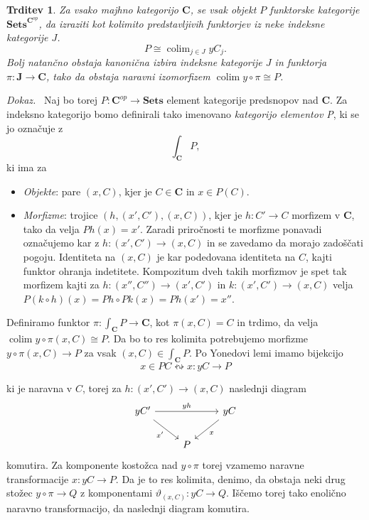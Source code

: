 \documentclass[12pt,a4paper]{book}
\theoremstyle{definition}
\theoremstyle{plain}
\newtheorem{trditev}[definicija]{Trditev}
\newenvironment{dokaz}{\emph{Dokaz.}\ }{\hspace{\fill}{$\Box$}}
\theoremstyle{definition}
\theoremstyle{remark}
\newcommand{\cat}[1]{\textbf{#1}}
\DeclareMathOperator{\colim}{colim}
\newcommand{\predsnop}[1]{\cat{Sets}^{\cat{#1}^{op}}}
\begin{document}
\begin{trditev}
\label{density theorem}
Za vsako majhno kategorijo $\cat{C}$, se vsak objekt $P$ funktorske kategorije $\predsnop{C}$, da izraziti kot kolimito predstavljivih funktorjev iz neke indeksne kategorije $J$.
$$ P \cong \colim_{j \in J} yC_j.$$
Bolj natančno obstaja kanonična izbira indeksne kategorije $J$ in funktorja $\pi : \cat{J} \to \cat{C}$, tako da obstaja naravni izomorfizem $\colim y \circ \pi \cong P$.
\end{trditev}
\begin{dokaz}
Naj bo torej $P : \cat{C}^{op} \to \cat{Sets}$ element kategorije predsnopov nad $\cat{C}$. Za indeksno kategorijo bomo definirali tako imenovano \emph{kategorijo elementov P}, ki se jo označuje z
$$\int_{\cat{C}}P,$$
ki ima za
\begin{itemize}
\item \emph{Objekte}: pare $(x,C)$, kjer je $C \in \cat{C}$ in $x \in P(C)$.
\item \emph{Morfizme}: trojice $(h, (x',C'), (x,C))$, kjer je $h : C' \to C$ morfizem v $\cat{C}$, tako da velja $Ph(x) = x'$. Zaradi priročnosti te morfizme ponavadi označujemo kar z $h : (x', C') \to (x,C)$ in se zavedamo da morajo zadoščati pogoju.
Identiteta na $(x,C)$ je kar podedovana identiteta na $C$, kajti funktor ohranja indetitete. Kompozitum dveh takih morfizmov je spet tak morfizem kajti za $h : (x'', C'') \to (x', C')$ in $k : (x', C') \to (x,C)$ velja $P(k \circ h)(x) = Ph \circ Pk(x) = Ph(x') = x''$.
\end{itemize}

Definiramo funktor $\pi : \int_{\cat{C}}P \to \cat{C}$, kot $\pi(x,C) = C$ in trdimo, da velja $\colim y\circ \pi (x,C) \cong P$. Da bo to res kolimita potrebujemo morfizme $y\circ \pi (x,C) \to P$ za vsak $(x,C) \in \int_{\cat{C}}P$. Po Yonedovi lemi imamo bijekcijo
$$x \in PC \leftrightsquigarrow x:yC \to P$$

ki je naravna v $C$, torej za $h: (x',C') \to (x,C)$ naslednji diagram
$$ \begin{tikzcd}
yC' \ar[rr, "yh"] \ar[rd, "x'"'] & & yC \ar[ld, "x"] \\
& P &
\end{tikzcd} $$
komutira. Za komponente kostožca nad $y \circ \pi$ torej vzamemo naravne transformacije $x : yC \to P$. Da je to res kolimita, denimo, da obstaja neki drug stožec $y \circ \pi \to Q$ z komponentami $\vartheta_{(x,C)} : yC \to Q$. Iščemo torej tako enolično naravno transformacijo, da naslednji diagram komutira.


\end{dokaz}
\end{document}
